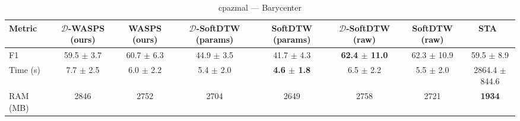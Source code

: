 \begin{table}[htbp]
\centering
\begin{NiceTabular}{lccccccc}
\toprule
Metric & $\mathcal{D}$-WASPS (ours) & WASPS (ours) & $\mathcal{D}$-SoftDTW (params) & SoftDTW (params) & $\mathcal{D}$-SoftDTW (raw) & SoftDTW (raw) & STA~\cite{janati2020spatio} \\
\midrule
F1 & 59.5 $\pm$ 3.7 & 60.7 $\pm$ 6.3 & 44.9 $\pm$ 3.5 & 41.7 $\pm$ 4.3 & \textbf{62.4 $\pm$ 11.0} & 62.3 $\pm$ 10.9 & 59.5 $\pm$ 8.9 \\
Time (s) & 7.7 $\pm$ 2.5 & 6.0 $\pm$ 2.2 & 5.4 $\pm$ 2.0 & \textbf{4.6 $\pm$ 1.8} & 6.5 $\pm$ 2.2 & 5.5 $\pm$ 2.0 & 2864.4 $\pm$ 844.6 \\
RAM (MB) & 2846 & 2752 & 2704 & 2649 & 2758 & 2721 & \textbf{1934} \\
\bottomrule
\end{NiceTabular}
\caption{cpazmal --- Barycenter}
\label{tab:exp2_cpazmal_barycenter}
\end{table}
